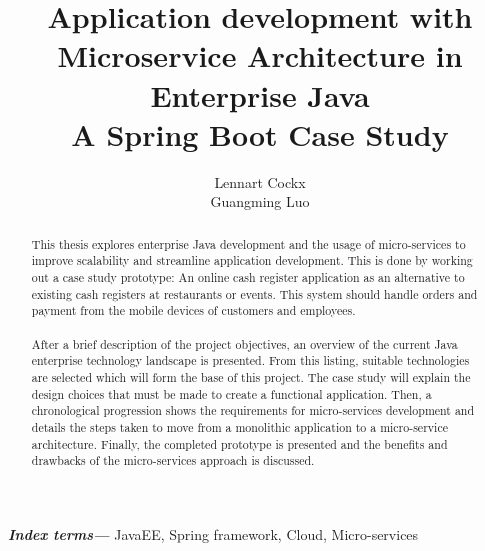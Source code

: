 \documentclass[12pt]{article}
\title{Application development with\\ Microservice Architecture in Enterprise Java\\ A Spring Boot Case Study}
\author{Lennart Cockx\\Guangming Luo}
\providecommand{\keywords}[1]{\textbf{\textit{Index terms---}} #1}
\begin{document}
\maketitle
\newpage
\tableofcontents
\newpage

\begin{abstract}
\noindent This thesis explores enterprise Java development and the usage of micro-services to improve scalability and streamline application development. This is done by working out a case study prototype: An online cash register application as an alternative to existing cash registers at restaurants or events. This system should handle orders and payment from the mobile devices of customers and employees.
\\\\
After a brief description of the project objectives, an overview of the current Java enterprise technology landscape is presented. From this listing, suitable technologies are selected which will form the base of this project. The case study will explain the design choices that must be made to create a functional application. Then, a chronological progression shows the requirements for micro-services development and details the steps taken to move from a monolithic application to a micro-service architecture. Finally, the completed prototype is presented and the benefits and drawbacks of the micro-services approach is discussed. 
\end{abstract}
\keywords{JavaEE, Spring framework, Cloud, Micro-services}
\end{document}
